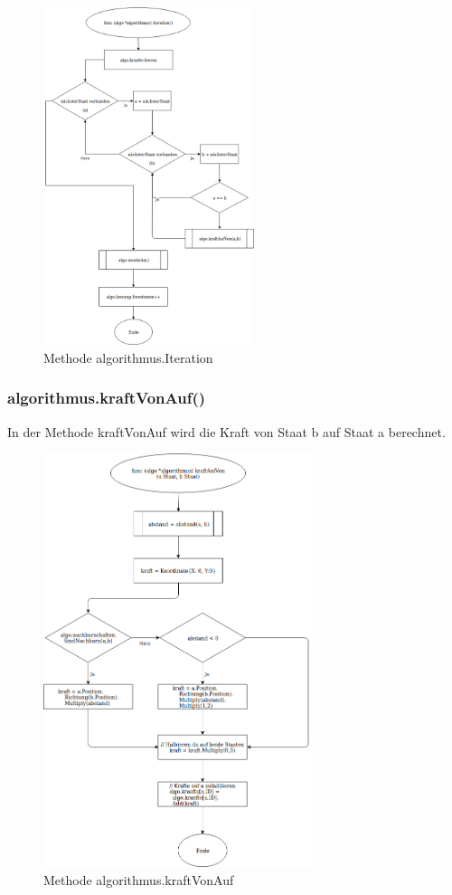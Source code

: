 \begin{figure}[h!]
    \centering
    \includegraphics[width=0.55\textwidth,]{Iteration.png}
    \caption[]{Methode algorithmus.Iteration}
\end{figure}

\FloatBarrier

\subsubsection{algorithmus.kraftVonAuf()}
In der Methode kraftVonAuf wird die Kraft von Staat b auf Staat a berechnet.

\begin{figure}[h!]
    \centering
    \includegraphics[width=0.7\textwidth,]{kraftVonAuf.png}
    \caption[]{Methode algorithmus.kraftVonAuf}
\end{figure}

